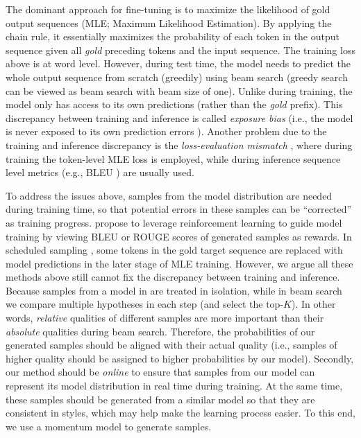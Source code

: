 \documentclass{article}
\begin{document}
The dominant approach for fine-tuning is to maximize the likelihood of gold output sequences (MLE; Maximum Likelihood Estimation). By applying the chain rule, it essentially maximizes the probability of each token in the output sequence given all \emph{gold} preceding tokens and the input sequence. The training loss above is at word level. However, during test time, the model needs to predict the whole output sequence from scratch (greedily) using beam search (greedy search can be viewed as beam search with beam size of one). Unlike during training, the model only has access to its own predictions (rather than the \emph{gold} prefix). This discrepancy between training and inference is called \emph{exposure bias} \cite{ranzato:2015:arxiv} (i.e., the model is never exposed to its own prediction errors \cite{wiseman-rush-2016-sequence}). Another problem due to the training and inference discrepancy is the \emph{loss-evaluation mismatch} \cite{wiseman-rush-2016-sequence}, where during training the token-level MLE loss is employed, while during inference sequence level metrics (e.g., BLEU \cite{papineni-etal-2002-bleu}) are usually used.

To address the issues above, samples from the model distribution are needed during training time, so that potential errors in these samples can be ``corrected'' as training progress. \cite{ranzato:2015:arxiv,edunov2017classical} propose to leverage reinforcement learning to guide model training by viewing BLEU \cite{papineni-etal-2002-bleu} or ROUGE \cite{lin-2004-rouge} scores of generated samples as rewards. In scheduled sampling \cite{bengio2015scheduled}, some tokens in the gold target sequence are replaced with model predictions in the later stage of MLE training. However, we argue all these methods above still cannot fix the discrepancy between training and inference. Because samples from a model in \cite{ranzato:2015:arxiv,edunov2017classical,bengio2015scheduled} are treated in isolation, while in beam search we compare multiple hypotheses in each step (and select the top-$K$). In other words, \emph{relative} qualities of different samples are more important than their \emph{absolute} qualities during beam search. Therefore, the probabilities of our generated samples should be aligned with their actual quality (i.e., samples of higher quality should be assigned to higher probabilities by our model). Secondly, our method should be \emph{online} to ensure that samples from our model can represent its model distribution in real time during training. At the same time, these samples should be generated from a similar model so that they are consistent in styles, which may help make the learning process easier. To this end, we use a momentum model to generate samples.
\end{document}
